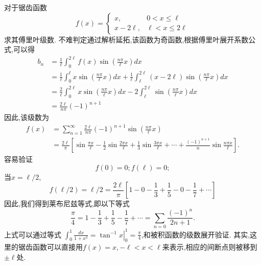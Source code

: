 \begin{examplebox}{
对于锯齿函数
$$  
f(x)= \begin{cases}
  x,   &  0 < x \leq  \ell 
  \\
  x - 2 \ell,   & \ell < x \leq 2\ell
\end{cases}
$$
求其傅里叶级数.
}
不难判定通过解析延拓,该函数为奇函数,根据傅里叶展开系数公式,可以得
\begin{align}
b_n &=   \frac{1}{\ell} \int_{0}^{2\ell} f(x) \sin {  \left( \frac{n\pi}{\ell} x \right) } dx \nonumber
\\
&= \frac{1}{\ell} \int_{0}^{\ell} x  \sin {  \left( \frac{n\pi}{\ell} x \right) } dx \nonumber
  +
 \frac{1}{\ell} \int_{\ell}^{2\ell} (x - 2\ell) \sin {  \left( \frac{n\pi}{\ell} x \right) } dx \nonumber
 \\ 
 &= \frac{2}{\ell} \int_{0}^{2\ell} x \sin {  \left( \frac{n\pi}{\ell} x \right) } dx \nonumber
 -2 \int_{\ell}^{2\ell}   \sin {  \left( \frac{n\pi}{\ell} x \right) } dx \nonumber
 \\
 & = \frac{2\ell}{n\pi} (-1)^{n+1}  \nonumber
\end{align}
因此,该级数为
\begin{align}
f(x) &=  \sum_{n=1}^{\infty} \frac{2 \ell }{n\pi} (-1)^{n+1} \sin {  \left( \frac{n\pi}{\ell} x \right) }  \nonumber
\\
 & =\frac{2\ell}{\pi} \left[ \sin{\frac{\pi x}{\ell} } - \frac{1}{2}\sin{\frac{2\pi x}{\ell} } 
  +  \frac{1}{3}\sin{\frac{3\pi x}{\ell} } + \cdots + \frac{(-1)^{n+1}}{n}\sin{\frac{n\pi x}{\ell} }
 \right] \nonumber
.
\end{align}
容易验证
$$
  f(0) = 0; f(\ell) = 0;
$$
当$x=\ell/2$, 
$$
f(\ell/2) = \ell/2 =   \frac{2\ell}{\pi} \left[ 1 - 0 - \frac{1}{3} + \frac{1}{5} - 0 -\frac{1}{7}+ \cdots \right]
$$
因此,我们得到莱布尼兹等式,即以下等式
$$
\frac{\pi}{4} = 1-\frac{1}{3} + \frac{1}{5} - \frac{1}{7} + \cdots = \sum_{n=0} \frac{(-1)^n}{2n + 1} .
$$
上式可以通过等式
$\int_0^1 \frac{d x}{1+x^2}=\left.\tan ^{-1} x\right|_0 ^1=\frac{\pi}{4}$,和被积函数的级数展开验证.
其实,这里的锯齿函数可以直接用$f(x) = x, -\ell < x < \ell$来表示,相应的间断点则被移到$\pm \ell$处.
\end{examplebox}


